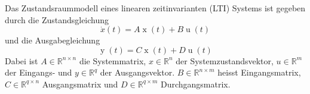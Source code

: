 Das Zustandsraummodell eines linearen zeitinvarianten (LTI) Systems ist gegeben durch die Zustandsgleichung	
$$\dot{x}(t) = A \operatorname{x}(t) + B \operatorname{u}(t)$$
und die Ausgabegleichung
$$\operatorname{y}(t) = C \operatorname{x}(t) + D \operatorname{u}(t)$$
Dabei ist $A \in \mathbb{R}^{n \times n}$ die Systemmatrix, $x \in \mathbb{R}^{n}$ der Systemzustandsvektor, $u \in \mathbb{R}^{m}$ der Eingangs- und $y \in \mathbb{R}^{q}$ der Ausgangsvektor. 
$B \in \mathbb{R}^{n \times m}$ heisst Eingangsmatrix, $C \in \mathbb{R}^{q \times n}$ Ausgangsmatrix und $D \in \mathbb{R}^{q \times m}$ Durchgangsmatrix.

